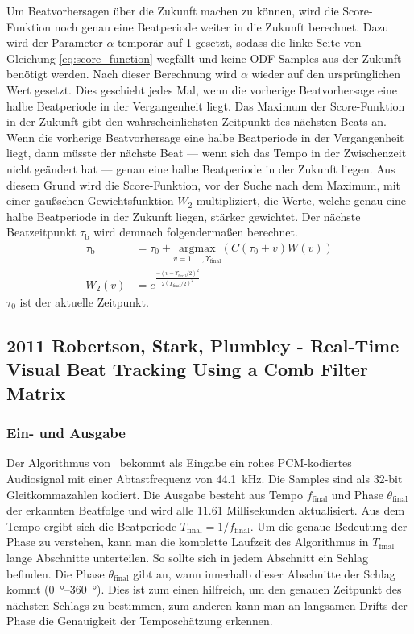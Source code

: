 {{{			%
			Um Beatvorhersagen über die Zukunft machen zu können,
				wird die Score-Funktion noch genau eine Beatperiode weiter in die Zukunft berechnet.
			Dazu wird der Parameter $\alpha$ temporär auf \num{1} gesetzt,
				sodass die linke Seite von Gleichung \eqref{eq:score_function} wegfällt
				und keine ODF-Samples aus der Zukunft benötigt werden.
			Nach dieser Berechnung wird $\alpha$ wieder auf den ursprünglichen Wert gesetzt.
			Dies geschieht jedes Mal,
				wenn die vorherige Beatvorhersage eine halbe Beatperiode in der Vergangenheit liegt.
			Das Maximum der Score-Funktion in der Zukunft gibt den wahrscheinlichsten Zeitpunkt des nächsten Beats an.
			Wenn die vorherige Beatvorhersage eine halbe Beatperiode in der Vergangenheit liegt,
				dann müsste der nächste Beat
				--- wenn sich das Tempo in der Zwischenzeit nicht geändert hat ---
				genau eine halbe Beatperiode in der Zukunft liegen.
			Aus diesem Grund wird die Score-Funktion,
				vor der Suche nach dem Maximum,
				mit einer gau{\ss}schen Gewichtsfunktion $W_2$ multipliziert,
				die Werte, welche genau eine halbe Beatperiode in der Zukunft liegen,
				stärker gewichtet.
			Der nächste Beatzeitpunkt $\tau_\text{b}$ wird demnach folgenderma{\ss}en berechnet.
			\begin{align}
				\tau_\text{b} &= \tau_0 + \underset{v = 1, ..., \Upsilon_\text{final}}{\text{argmax}}(C(\tau_0 + v)W(v)) \\
				W_2(v) &= e^{\frac{-(v - \Upsilon_\text{final} / 2)^2}{2(\Upsilon_\text{final} / 2)^2}}
			\end{align}
			$\tau_0$ ist der aktuelle Zeitpunkt.
		}
	}

	\subsection{2011 Robertson, Stark, Plumbley - Real-Time Visual Beat Tracking Using a Comb Filter Matrix}
	{
		\subsubsection*{Ein- und Ausgabe}
		{
			Der Algorithmus von~\cite{2011_PlRoSt} bekommt als Eingabe ein rohes PCM-kodiertes Audiosignal mit einer Abtastfrequenz von \SI{44.1}{\kilo\hertz}.
			Die Samples sind als 32-bit Gleitkommazahlen kodiert.
			Die Ausgabe besteht aus Tempo $f_\text{final}$ und Phase $\theta_\text{final}$ der erkannten Beatfolge
				und wird alle \num{11.61} Millisekunden aktualisiert.
			Aus dem Tempo ergibt sich die Beatperiode $T_\text{final} = 1 / f_\text{final}$.
			Um die genaue Bedeutung der Phase zu verstehen,
				kann man die komplette Laufzeit des Algorithmus in $T_\text{final}$ lange Abschnitte unterteilen.
			So sollte sich in jedem Abschnitt ein Schlag befinden.
			Die Phase $\theta_\text{final}$ gibt an,
				wann innerhalb dieser Abschnitte der Schlag kommt (\SIrange{0}{360}{\degree}).
			Dies ist zum einen hilfreich,
				um den genauen Zeitpunkt des nächsten Schlags zu bestimmen,
				zum anderen kann man an langsamen Drifts der Phase die Genauigkeit der Temposchätzung erkennen.
		}

}}

